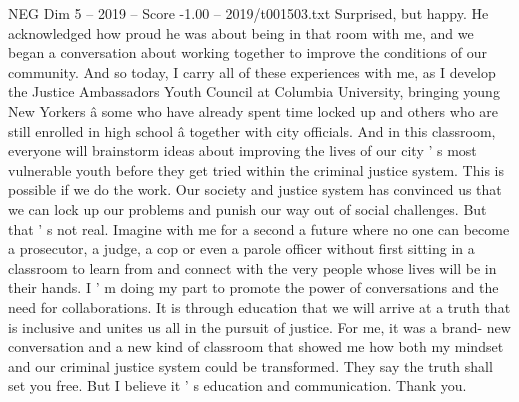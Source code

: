 \begin{textsample}{NEG Dim 5 – 2019 – Score -1.00 – 2019/t001503.txt}
Surprised, but happy.
He acknowledged how proud he was about being in that room with me, and we began a conversation about working together to improve the conditions of our community.
And so today, I carry all of these experiences with me, as I develop the Justice Ambassadors Youth Council at Columbia University, bringing young New Yorkers â some who have already spent time locked up and others who are still enrolled in high school â together with city officials.
And in this classroom, everyone will brainstorm ideas about improving the lives of our city ' s most vulnerable youth before they get tried within the criminal justice system.
This is possible if we do the work.
Our society and justice system has convinced us that we can lock up our problems and punish our way out of social challenges.
But that ' s not real.
Imagine with me for a second a future where no one can become a prosecutor, a judge, a cop or even a parole officer without first sitting in a classroom to learn from and connect with the very people whose lives will be in their hands.
I ' m doing my part to promote the power of conversations and the need for collaborations.
It is through education that we will arrive at a truth that is inclusive and unites us all in the pursuit of justice.
For me, it was a brand- new conversation and a new kind of classroom that showed me how both my mindset and our criminal justice system could be transformed.
They say the truth shall set you free.
But I believe it ' s education and communication.
Thank you.

\end{textsample}
